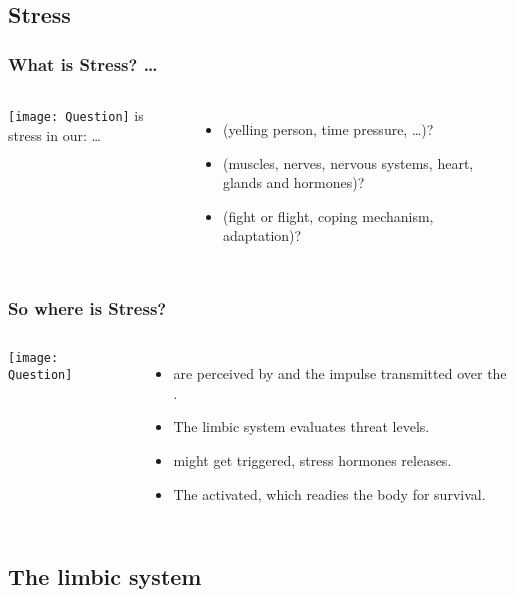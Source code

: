 \documentclass[../main.tex]{subfiles}
\begin{document}
\subsection{Stress}
\begin{frame}
  \frametitle{What is Stress? \ldots}
\begin{columns}[c] %
\texttt{[image: Question]}
is stress in our: \ldots 
 \begin{itemize}
 \item {} (yelling person, time pressure, \ldots {})?
 \item  {} (muscles, nerves, nervous systems, heart, glands and hormones)?
 \item  {} (fight or flight, coping mechanism, adaptation)?
   \end{itemize}
\end{columns}
\end{frame}

\begin{frame}
  \frametitle{So where is Stress?}
\begin{columns}[c] %
\texttt{[image: Question]}
 \begin{itemize}
 \item {} are perceived by  and the impulse transmitted over the .
 \item  The \alert{limbic system} evaluates threat levels.
 \item  {} might get triggered, stress hormones releases.
 \item The  activated, which readies the body for survival.
   \end{itemize}
\end{columns}
\end{frame}

\subsection{The limbic system}
\end{document}
